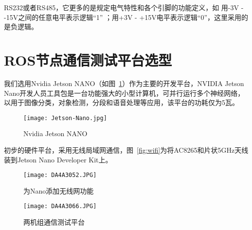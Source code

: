 RS232或者RS485，它更多的是规定电气特性和各个引脚的功能定义，如 用-3V - -15V之间的任意电平表示逻辑“1” ；用+3V - +15V电平表示逻辑“0”，这里采用的是负逻辑。



\section{ROS节点通信测试平台选型}

我们选用Nvidia Jetson NANO（如图~\ref{fig:Jetson-Nano}）作为主要的开发平台，NVIDIA Jetson Nano开发人员工具包是一台功能强大的小型计算机，可并行运行多个神经网络，以用于图像分类，对象检测，分段和语音处理等应用，该平台的功耗仅为5瓦。

\begin{figure}[htbp] %
    \centering
    \texttt{[image: Jetson-Nano.jpg]}
    \caption{Nvidia Jetson NANO}
    \label{fig:Jetson-Nano}
\end{figure}

初步的硬件平台，采用无线局域网通信，图~\ref{fig:wifi}为将AC8265和片状5GHz天线装到Jetson Nano Developer Kit上。

\begin{figure}[htbp]
    \begin{minipage}{0.48\textwidth}
      \centering
      \texttt{[image: DA4A3052.JPG]}
      \caption{为Nano添加无线网功能}
      \label{fig:wifi}
    \end{minipage}\hfill
    \begin{minipage}{0.48\textwidth}
      \centering
      \texttt{[image: DA4A3066.JPG]}
      \caption{两机组通信测试平台}
      \label{fig:two-setup}
    \end{minipage}
\end{figure}

